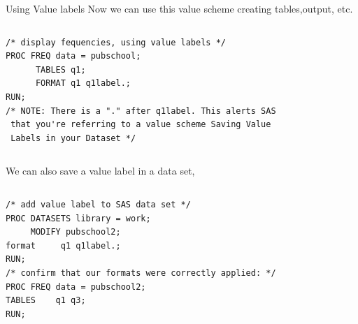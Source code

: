 \documentclass[table,smaller]{beamer}
\begin{document}
\begin{frame}[fragile,label=sec-4-4]{Using Value labels}
 Now we can use this value scheme creating tables,output, etc.

\vspace{-.75em} \begin{columns}  \begin{block}{}
\begin{verbatim}
/* display fequencies, using value labels */
PROC FREQ data = pubschool;
      TABLES q1;
      FORMAT q1 q1label.;
RUN;
/* NOTE: There is a "." after q1label. This alerts SAS
 that you're referring to a value scheme Saving Value
 Labels in your Dataset */
\end{verbatim}
\end{block} \end{columns} \vspace{.25em}

We can also save a value label in a data set,
\vspace{-.75em} \begin{columns}  \begin{block}{}
\begin{verbatim}
/* add value label to SAS data set */
PROC DATASETS library = work;
     MODIFY pubschool2;
format     q1 q1label.;
RUN;
/* confirm that our formats were correctly applied: */
PROC FREQ data = pubschool2;
TABLES    q1 q3;
RUN;
\end{verbatim}
\end{block} \end{columns} \vspace{.25em}
\end{frame}
\end{document}
